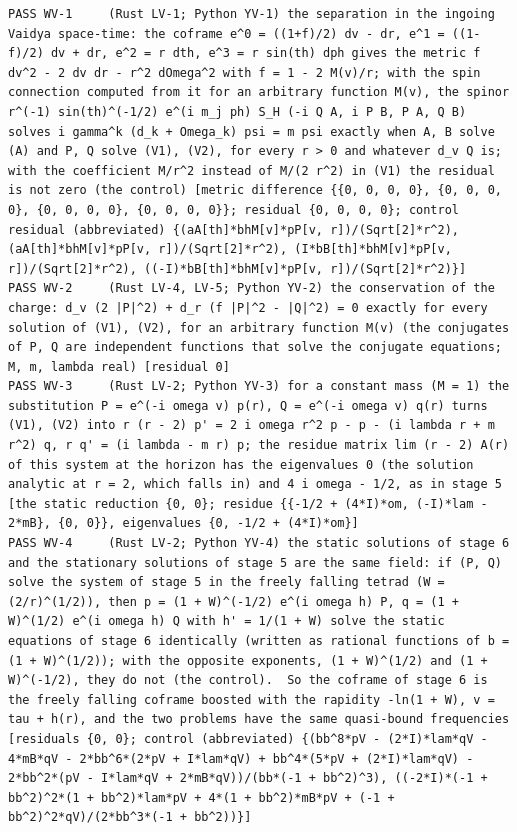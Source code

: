 \documentclass[
  10pt,
]{article}
\begin{document}
\begin{verbatim}
PASS WV-1     (Rust LV-1; Python YV-1) the separation in the ingoing Vaidya space-time: the coframe e^0 = ((1+f)/2) dv - dr, e^1 = ((1-f)/2) dv + dr, e^2 = r dth, e^3 = r sin(th) dph gives the metric f dv^2 - 2 dv dr - r^2 dOmega^2 with f = 1 - 2 M(v)/r; with the spin connection computed from it for an arbitrary function M(v), the spinor r^(-1) sin(th)^(-1/2) e^(i m_j ph) S_H (-i Q A, i P B, P A, Q B) solves i gamma^k (d_k + Omega_k) psi = m psi exactly when A, B solve (A) and P, Q solve (V1), (V2), for every r > 0 and whatever d_v Q is; with the coefficient M/r^2 instead of M/(2 r^2) in (V1) the residual is not zero (the control) [metric difference {{0, 0, 0, 0}, {0, 0, 0, 0}, {0, 0, 0, 0}, {0, 0, 0, 0}}; residual {0, 0, 0, 0}; control residual (abbreviated) {(aA[th]*bhM[v]*pP[v, r])/(Sqrt[2]*r^2), (aA[th]*bhM[v]*pP[v, r])/(Sqrt[2]*r^2), (I*bB[th]*bhM[v]*pP[v, r])/(Sqrt[2]*r^2), ((-I)*bB[th]*bhM[v]*pP[v, r])/(Sqrt[2]*r^2)}]
PASS WV-2     (Rust LV-4, LV-5; Python YV-2) the conservation of the charge: d_v (2 |P|^2) + d_r (f |P|^2 - |Q|^2) = 0 exactly for every solution of (V1), (V2), for an arbitrary function M(v) (the conjugates of P, Q are independent functions that solve the conjugate equations; M, m, lambda real) [residual 0]
PASS WV-3     (Rust LV-2; Python YV-3) for a constant mass (M = 1) the substitution P = e^(-i omega v) p(r), Q = e^(-i omega v) q(r) turns (V1), (V2) into r (r - 2) p' = 2 i omega r^2 p - p - (i lambda r + m r^2) q, r q' = (i lambda - m r) p; the residue matrix lim (r - 2) A(r) of this system at the horizon has the eigenvalues 0 (the solution analytic at r = 2, which falls in) and 4 i omega - 1/2, as in stage 5 [the static reduction {0, 0}; residue {{-1/2 + (4*I)*om, (-I)*lam - 2*mB}, {0, 0}}, eigenvalues {0, -1/2 + (4*I)*om}]
PASS WV-4     (Rust LV-2; Python YV-4) the static solutions of stage 6 and the stationary solutions of stage 5 are the same field: if (P, Q) solve the system of stage 5 in the freely falling tetrad (W = (2/r)^(1/2)), then p = (1 + W)^(-1/2) e^(i omega h) P, q = (1 + W)^(1/2) e^(i omega h) Q with h' = 1/(1 + W) solve the static equations of stage 6 identically (written as rational functions of b = (1 + W)^(1/2)); with the opposite exponents, (1 + W)^(1/2) and (1 + W)^(-1/2), they do not (the control).  So the coframe of stage 6 is the freely falling coframe boosted with the rapidity -ln(1 + W), v = tau + h(r), and the two problems have the same quasi-bound frequencies [residuals {0, 0}; control (abbreviated) {(bb^8*pV - (2*I)*lam*qV - 4*mB*qV - 2*bb^6*(2*pV + I*lam*qV) + bb^4*(5*pV + (2*I)*lam*qV) - 2*bb^2*(pV - I*lam*qV + 2*mB*qV))/(bb*(-1 + bb^2)^3), ((-2*I)*(-1 + bb^2)^2*(1 + bb^2)*lam*pV + 4*(1 + bb^2)*mB*pV + (-1 + bb^2)^2*qV)/(2*bb^3*(-1 + bb^2))}]

\end{verbatim}
\end{document}
